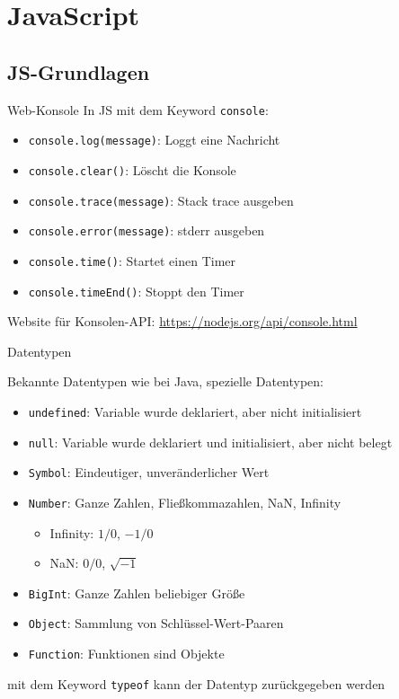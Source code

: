 

\section{JavaScript}

\subsection{JS-Grundlagen}
\begin{code}{Web-Konsole}
    In JS mit dem Keyword \texttt{console}:
    \begin{itemize}
        \item \texttt{console.log(message)}: Loggt eine Nachricht
        \item \texttt{console.clear()}: Löscht die Konsole
        \item \texttt{console.trace(message)}: Stack trace ausgeben
        \item \texttt{console.error(message)}: stderr ausgeben
        \item \texttt{console.time()}: Startet einen Timer
        \item \texttt{console.timeEnd()}: Stoppt den Timer
    \end{itemize}
    Website für Konsolen-API: \url{https://nodejs.org/api/console.html}
\end{code}

\begin{definition}{Datentypen}
    
    Bekannte Datentypen wie bei Java, spezielle Datentypen:
    \begin{itemize}
        \item \texttt{undefined}: Variable wurde deklariert, aber nicht initialisiert
        \item \texttt{null}: Variable wurde deklariert und initialisiert, aber nicht belegt
        \item \texttt{Symbol}: Eindeutiger, unveränderlicher Wert
        \item \texttt{Number}: Ganze Zahlen, Fließkommazahlen, NaN, Infinity
        \begin{itemize}
            \item Infinity: $1/0$, $-1/0$
            \item NaN: $0/0$, $\sqrt{-1}$
        \end{itemize}
        \item \texttt{BigInt}: Ganze Zahlen beliebiger Größe
        \item \texttt{Object}: Sammlung von Schlüssel-Wert-Paaren
        \item \texttt{Function}: Funktionen sind Objekte
    \end{itemize}
    mit dem Keyword \texttt{typeof} kann der Datentyp zurückgegeben werden
\end{definition}

